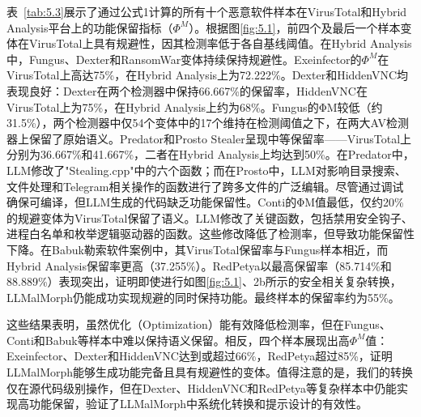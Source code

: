 表~\ref{tab:5.3}展示了通过公式1计算的所有十个恶意软件样本在VirusTotal和Hybrid Analysis平台上的功能保留指标（$\Phi^{M}$）。根据图\ref{fig:5.1}，前四个及最后一个样本变体在VirusTotal上具有规避性，因其检测率低于各自基线阈值。在Hybrid Analysis中，Fungus、Dexter和RansomWar变体持续保持规避性。Exeinfector的$\Phi^{M}$在VirusTotal上高达75\%，在Hybrid Analysis上为72.222\%。Dexter和HiddenVNC均表现良好：Dexter在两个检测器中保持66.667\%的保留率，HiddenVNC在VirusTotal上为75\%，在Hybrid Analysis上约为68\%。Fungus的ΦM较低（约31.5\%），两个检测器中仅54个变体中的17个维持在检测阈值之下，在两大AV检测器上保留了原始语义。Predator和Prosto Stealer呈现中等保留率——VirusTotal上分别为36.667\%和41.667\%，二者在Hybrid Analysis上均达到50\%。在Predator中，LLM修改了"Stealing.cpp"中的六个函数；而在Prosto中，LLM对影响目录搜索、文件处理和Telegram相关操作的函数进行了跨多文件的广泛编辑。尽管通过调试确保可编译，但LLM生成的代码缺乏功能保留性。Conti的ΦM值最低，仅约20\%的规避变体为VirusTotal保留了语义。LLM修改了关键函数，包括禁用安全钩子、进程白名单和枚举逻辑驱动器的函数。这些修改降低了检测率，但导致功能保留性下降。在Babuk勒索软件案例中，其VirusTotal保留率与Fungus样本相近，而Hybrid Analysis保留率更高（37.255\%）。RedPetya以最高保留率（85.714\%和88.889\%）表现突出，证明即使进行如图\ref{fig:5.1}、2b所示的安全相关复杂转换，LLMalMorph仍能成功实现规避的同时保持功能。最终样本的保留率约为55\%。

这些结果表明，虽然优化（Optimization）能有效降低检测率，但在Fungus、Conti和Babuk等样本中难以保持语义保留。相反，四个样本展现出高$\Phi^{M}$值：Exeinfector、Dexter和HiddenVNC达到或超过66\%，RedPetya超过85\%，证明LLMalMorph能够生成功能完备且具有规避性的变体。值得注意的是，我们的转换仅在源代码级别操作，但在Dexter、HiddenVNC和RedPetya等复杂样本中仍能实现高功能保留，验证了LLMalMorph中系统化转换和提示设计的有效性。